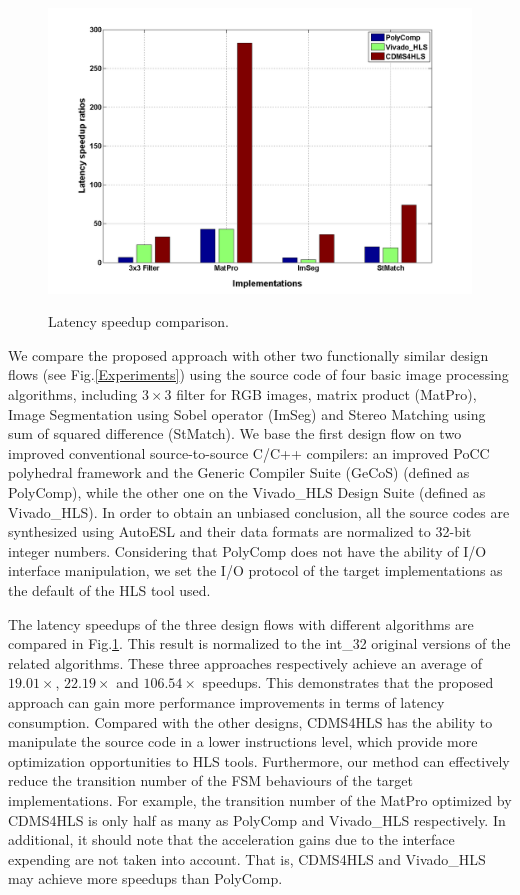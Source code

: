 \documentclass[10pt,twocolumn,letterpaper]{article}
\begin{document}
    \begin{figure}
    \centering
    \includegraphics[width=\linewidth]{LatencySpeedupComparison.png}\\
    \caption{Latency speedup comparison.}
    \label{LatencySpeedupComparison}
    \end{figure}
We compare the proposed approach with other two functionally similar design flows (see Fig.\ref{Experiments}) using the source code of four basic image processing algorithms, including $3\times 3$ filter for RGB images, matrix product (MatPro), Image Segmentation using Sobel operator (ImSeg) and Stereo Matching using sum of squared difference (StMatch). We base the first design flow on two improved conventional source-to-source C/C++ compilers: an improved PoCC polyhedral framework \cite{54,65,66} and the Generic Compiler Suite (GeCoS) \cite{55,56,57} (defined as PolyComp), while the other one on the Vivado\_HLS Design Suite \cite{61} (defined as Vivado\_HLS). In order to obtain an unbiased conclusion, all the source codes are synthesized using AutoESL and their data formats are normalized to 32-bit integer numbers. Considering that PolyComp does not have the ability of I/O interface manipulation, we set the I/O protocol of the target implementations as the default of the HLS tool used.

The latency speedups of the three design flows with different algorithms are compared in Fig.\ref{LatencySpeedupComparison}. This result is normalized to the int\_32 original versions of the related algorithms. These three approaches respectively achieve an average of $19.01\times$, $22.19\times$ and $106.54\times$ speedups. This demonstrates that the proposed approach can gain more performance improvements in terms of latency consumption. Compared with the other designs, CDMS4HLS has the ability to manipulate the source code in a lower instructions level, which provide more optimization opportunities to HLS tools. Furthermore, our method can effectively reduce the transition number of the FSM behaviours of the target implementations. For example, the transition number of the MatPro optimized by CDMS4HLS is only half as many as PolyComp and Vivado\_HLS respectively. In additional, it should note that the acceleration gains due to the interface expending are not taken into account. That is, CDMS4HLS and Vivado\_HLS may achieve more speedups than PolyComp.
\end{document}
